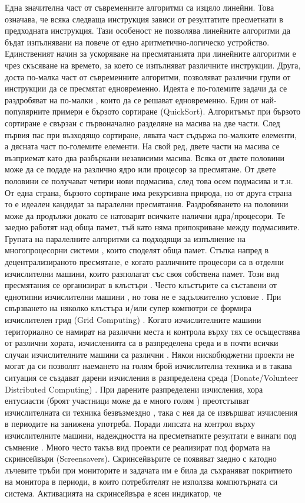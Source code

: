 Една значителна част от съвременните алгоритми са изцяло линейни. Това означава, че всяка следваща инструкция зависи от резултатите пресметнати в предходната инструкция. Тази особеност не позволява линейните алгоритми да бъдат изпълнявани на повече от едно аритметично-логическо устройство. Единственият начин за ускоряване на пресмятанията при линейните алгоритми е чрез скъсяване на времето, за което се изпълняват различните инструкции. Друга, доста по-малка част от съвременните алгоритми, позволяват различни групи от инструкции да се пресмятат едновременно. Идеята е по-големите задачи да се раздробяват на по-малки \cite{Mendivil-01}, които да се решават едновременно. Един от най-популярните примери е бързото сортиране (QuickSort). Алгоритъмът при бързото сортиране е свързан с първоначално разделяне на масива на две части. След първия пас при възходящо сортиране, лявата част съдържа по-малките елементи, а дясната част по-големите елементи. На свой ред, двете части на масива се възприемат като два разбъркани независими масива. Всяка от двете половини може да се подаде на различно ядро или процесор за пресмятане. От двете половини се получават четири нови подмасива, след това осем подмасива и т.н. От една страна, бързото сортиране има рекурсивна природа, но от друга страна то е идеален кандидат за паралелни пресмятания. Раздробяването на половини може да продължи докато се натоварят всичките налични ядра/процесори. Те заедно работят над обща памет, тъй като няма припокриване между подмасивите. Групата на паралелните алгоритми са подходящи за изпълнение на многопроцесорни системи \cite{Topping-01}, които споделят обща памет. Стъпка напред в децентрализираното пресмятане, е когато различните процесори са в отделни изчислителни машини, които разполагат със своя собствена памет. Този вид пресмятания се организират в клъстъри \cite{Desell-02}. Често клъстърите са съставени от еднотипни изчислителни машини \cite{Qu-01}, но това не е задължително условие \cite{Wang-02}. При свързването на няколко клъстъра и/или супер компютри се формира изчислителен грид (Grid Computing) \cite{Tiwari-01}. Когато изчислителните машини териториално се намират на различни места и контрола върху тях се осъществява от различни хората, изчисленията са в разпределена среда и в почти всички случаи изчислителните машини са различни \cite{Kattan-02}. Някои нискобюджетни проекти не могат да си позволят наемането на голям брой изчислителна техника \cite{Merelo-Guervos-01} и в такава ситуация се създават дарени изчисления в разпределена среда (Donate/Volunteer Distributed Computing) \cite{Varacha-01}. При дарените разпределени изчисления, хора ентусиасти (броят участници може да е много голям \cite{Castillo-01}) преотстъпват изчислителната си техника безвъзмездно \cite{Cole-01}, така с нея да се извършват изчисления в периодите на занижена употреба. Поради липсата на контрол върху изчислителните машини, надеждността на пресметнатите резултати е винаги под съмнение \cite{Desell-04}. Много често такъв вид проекти се реализират под формата на скринсейвъри (Screensavers). Скринсейвърите се появяват заедно с катодно лъчевите тръби при мониторите и задачата им е била да съхраняват покритието на монитора в периоди, в които потребителят не използва компютърната си система. Активацията на скринсейвъра е ясен индикатор, че 
